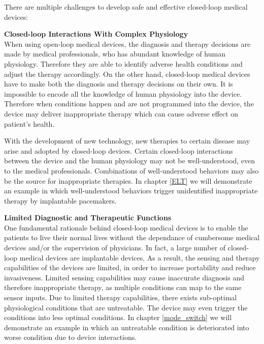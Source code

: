 There are multiple challenges to develop safe and effective closed-loop medical devices:

\textbf{Closed-loop Interactions With Complex Physiology}\\
When using open-loop medical devices, the diagnosis and therapy decisions are made by medical professionals, who has abundant knowledge of human physiology. Therefore they are able to identify adverse health conditions and adjust the therapy accordingly. On the other hand, closed-loop medical devices have to make both the diagnosis and therapy decisions on their own. It is impossible to encode all the knowledge of human physiology into the device. Therefore when conditions happen and are not programmed into the device, the device may deliver inappropriate therapy which can cause adverse effect on patient's health. 

With the development of new technology, new therapies to certain disease may arise and adopted by closed-loop devices. Certain closed-loop interactions between the device and the human physiology may not be well-understood, even to the medical professionals. Combinations of well-understood behaviors may also be the source for inappropriate therapies. In chapter \ref{ELT} we will demonstrate an example in which well-understood behaviors trigger unidentified inappropriate therapy by implantable pacemakers.

\textbf{Limited Diagnostic and Therapeutic Functions}\\
One fundamental rationale behind closed-loop medical devices is to enable the patients to live their normal lives without the dependance of cumbersome medical devices and/or the supervision of physicians. In fact, a large number of closed-loop medical devices are implantable devices. As a result, the sensing and therapy capabilities of the devices are limited, in order to increase portability and reduce invasiveness. Limited sensing capabilities may cause inaccurate diagnosis and therefore inappropriate therapy, as multiple conditions can map to the same sensor inputs. Due to limited therapy capabilities, there exists sub-optimal physiological conditions that are untreatable. The device may even trigger the conditions into less optimal conditions. In chapter \ref{mode_switch} we will demonstrate an example in which an untreatable condition is deteriorated into worse condition due to device interactions.

